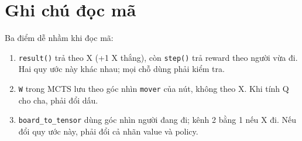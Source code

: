 \section{Ghi chú đọc mã}
Ba điểm dễ nhầm khi đọc mã:
\begin{enumerate}
  \item \texttt{result()} trả theo X (+1 X thắng), còn \texttt{step()} trả reward theo người
        vừa đi. Hai quy ước này khác nhau; mọi chỗ dùng phải kiểm tra.
  \item \texttt{W} trong MCTS lưu theo góc nhìn \texttt{mover} của nút, không theo X. Khi tính
        Q cho cha, phải đổi dấu.
  \item \texttt{board\_to\_tensor} dùng góc nhìn người đang đi; kênh 2 bằng 1 nếu X đi. Nếu đổi
        quy ước này, phải đổi cả nhãn value và policy.
\end{enumerate}